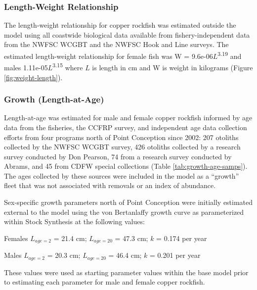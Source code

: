 \documentclass[11pt,
  letterpaper,
]{article}
\begin{document}
\subsubsection{Length-Weight Relationship}\label{length-weight-relationship}

The length-weight relationship for copper rockfish was estimated outside the model using all coastwide biological data available from fishery-independent data from the NWFSC WCGBT and the NWFSC Hook and Line surveys. The estimated length-weight relationship for female fish was W = 9.6e-06\(L\)\textsuperscript{3.19} and males 1.11e-05\(L\)\textsuperscript{3.15} where \(L\) is length in cm and W is weight in kilograms (Figure \ref{fig:weight-length}).

\subsubsection{Growth (Length-at-Age)}\label{length-at-age}

Length-at-age was estimated for male and female copper rockfish informed by age data from the fisheries, the CCFRP survey, and independent age data collection efforts from four programs north of Point Conception since 2002: 207 otoliths collected by the NWFSC WCGBT survey, 426 otoliths collected by a research survey conducted by Don Pearson, 74 from a research survey conducted by Abrams, and 45 from CDFW special collections (Table \ref{tab:growth-age-samps}). The ages collected by these sources were included in the model as a ``growth'' fleet that was not associated with removals or an index of abundance.

Sex-specific growth parameters north of Point Conception were initially estimated external to the model using the von Bertanlaffy growth curve as parameterized within Stock Synthesis at the following values:

\begin{centering}

Females $L_{age=2}$ = 21.4 cm; $L_{age=20}$ = 47.3 cm; $k$ = 0.174 per year

Males $L_{age=2}$ = 20.3 cm; $L_{age=20}$ = 46.4 cm; $k$ = 0.201 per year

\end{centering}

\vspace{0.50cm}

These values were used as starting parameter values within the base model prior to estimating each parameter for male and female copper rockfish.
\end{document}
